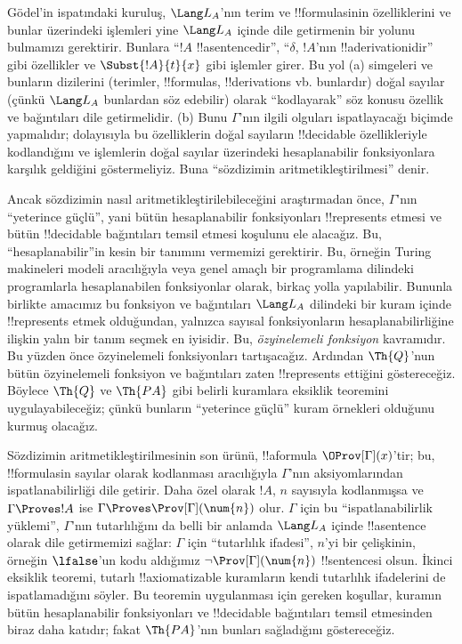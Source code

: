G\"odel'in ispatındaki kuruluş, $\Lang L_A$'nın terim ve !!{formula}s{}inin
özelliklerini ve bunlar üzerindeki işlemleri yine $\Lang L_A$ içinde dile
getirmenin bir yolunu bulmamızı gerektirir. Bunlara ``$!A$ !!a{sentence}{}dir'',
``$\delta$, $!A$'nın !!a{derivation}{}idir'' gibi özellikler ve
$\Subst{!A}{t}{x}$ gibi işlemler girer. Bu yol (a) simgeleri ve bunların
dizilerini (terimler, !!{formula}s, !!{derivation}s vb. bunlardır)
doğal sayılar (çünkü $\Lang L_A$ bunlardan söz edebilir) olarak
``kodlayarak'' söz konusu özellik ve bağıntıları dile getirmelidir. (b)
Bunu $\Gamma$'nın ilgili olguları ispatlayacağı biçimde yapmalıdır;
dolayısıyla bu özelliklerin doğal sayıların !!{decidable} özellikleriyle
kodlandığını ve işlemlerin doğal sayılar üzerindeki hesaplanabilir
fonksiyonlara karşılık geldiğini göstermeliyiz. Buna ``sözdizimin
aritmetikleştirilmesi'' denir.

Ancak sözdizimin nasıl aritmetikleştirilebileceğini araştırmadan önce,
$\Gamma$'nın ``yeterince güçlü'', yani bütün hesaplanabilir fonksiyonları
!!{represents} etmesi ve bütün !!{decidable} bağıntıları temsil etmesi
koşulunu ele alacağız.
Bu, ``hesaplanabilir''in kesin bir tanımını vermemizi gerektirir. Bu,
örneğin Turing makineleri modeli aracılığıyla veya genel amaçlı bir
programlama dilindeki programlarla hesaplanabilen fonksiyonlar olarak,
birkaç yolla yapılabilir. Bununla birlikte amacımız bu fonksiyon ve
bağıntıları $\Lang L_A$ dilindeki bir kuram içinde !!{represents} etmek
olduğundan, yalnızca sayısal fonksiyonların hesaplanabilirliğine ilişkin
yalın bir tanım seçmek en iyisidir. Bu, \emph{özyinelemeli fonksiyon}
kavramıdır. Bu yüzden önce özyinelemeli fonksiyonları tartışacağız. Ardından
$\Th{Q}$'nun bütün özyinelemeli fonksiyon ve bağıntıları zaten
!!{represents} ettiğini göstereceğiz. Böylece $\Th{Q}$ ve $\Th{PA}$ gibi
belirli kuramlara eksiklik teoremini uygulayabileceğiz; çünkü bunların
``yeterince güçlü'' kuram örnekleri olduğunu kurmuş olacağız.

Sözdizimin aritmetikleştirilmesinin son ürünü, !!a{formula}
$\OProv[\Gamma](x)$'tir; bu, !!{formula}s{}in sayılar olarak kodlanması
aracılığıyla $\Gamma$'nın aksiyomlarından ispatlanabilirliği dile getirir. Daha özel olarak $!A$,
$n$ sayısıyla kodlanmışsa ve $\Gamma \Proves !A$ ise
$\Gamma \Proves \Prov[\Gamma](\num{n})$ olur. $\Gamma$ için bu
``ispatlanabilirlik yüklemi'', $\Gamma$'nın tutarlılığını da belli bir
anlamda $\Lang L_A$ içinde !!a{sentence} olarak dile getirmemizi sağlar:
$\Gamma$ için ``tutarlılık ifadesi'', $n$'yi bir çelişkinin, örneğin
$\lfalse$'un kodu aldığımız $\lnot \Prov[\Gamma](\num{n})$ !!{sentence}{}si
olsun. İkinci eksiklik teoremi, tutarlı !!{axiomatizable} kuramların kendi
tutarlılık ifadelerini de ispatlamadığını söyler. Bu teoremin uygulanması
için gereken koşullar, kuramın bütün hesaplanabilir fonksiyonları ve
!!{decidable} bağıntıları temsil etmesinden biraz daha katıdır; fakat
$\Th{PA}$'nın bunları sağladığını göstereceğiz.

